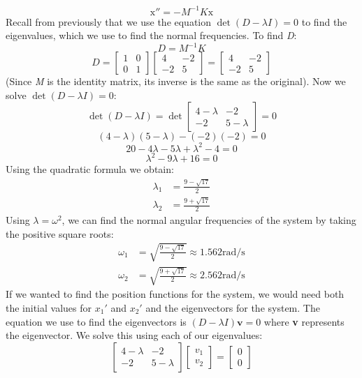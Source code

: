 \documentclass{article}
\begin{document}
$$ \text{x}'' = -M^{-1}K\text{x} $$
Recall from previously that we use the equation $ \det(D - \lambda I) = 0 $ to find the eigenvalues, which we use to find the 
normal frequencies. To find \textit{D}:
$$ D = M^{-1}K $$
\[
D = \begin{bmatrix}
    1 & 0 \\
    0 & 1
\end{bmatrix}
\begin{bmatrix}
    4 & -2 \\
    -2 & 5 
\end{bmatrix}
= \begin{bmatrix}
    4 & -2 \\
    -2 & 5
\end{bmatrix}
\]
(Since \textit{M} is the identity matrix, its inverse is the same as the original). Now we solve $ \det(D - \lambda I) = 0 $:
\[
\det(D - \lambda I) = \det\begin{bmatrix}
    4-\lambda & -2 \\
    -2 & 5-\lambda 
\end{bmatrix} = 0
\]
$$ (4-\lambda)(5-\lambda)-(-2)(-2)=0 $$
$$ 20-4\lambda-5\lambda+\lambda^2-4=0 $$
$$ \lambda^2-9\lambda+16=0 $$
Using the quadratic formula we obtain:
\begin{align*}
    \lambda_1 &= \frac{9-\sqrt{17}}{2} \\
    \lambda_2 &= \frac{9+\sqrt{17}}{2}
\end{align*}
Using $ \lambda = \omega^2 $, we can find the normal angular frequencies of the system by taking the positive square roots:
\begin{align*}
    \omega_1 &= \sqrt{\frac{9-\sqrt{17}}{2}} \approx 1.562 \text{rad/s} \\
    \omega_2 &= \sqrt{\frac{9+\sqrt{17}}{2}} \approx 2.562 \text{rad/s}
\end{align*}
If we wanted to find the position functions for the system, we would need both the initial values for $x_1'$ and $x_2'$
and the eigenvectors for the system. The equation we use to find the eigenvectors is $ (D-\lambda I)\textbf{v}=0$ where 
\textbf{v} represents the eigenvector. We solve this using each of our eigenvalues:
\[
\begin{bmatrix}
    4-\lambda & -2 \\
    -2 & 5-\lambda
\end{bmatrix}
\begin{bmatrix}
    v_1 \\
    v_2
\end{bmatrix}
= \begin{bmatrix}
    0 \\
    0
\end{bmatrix}
\]
\end{document}
